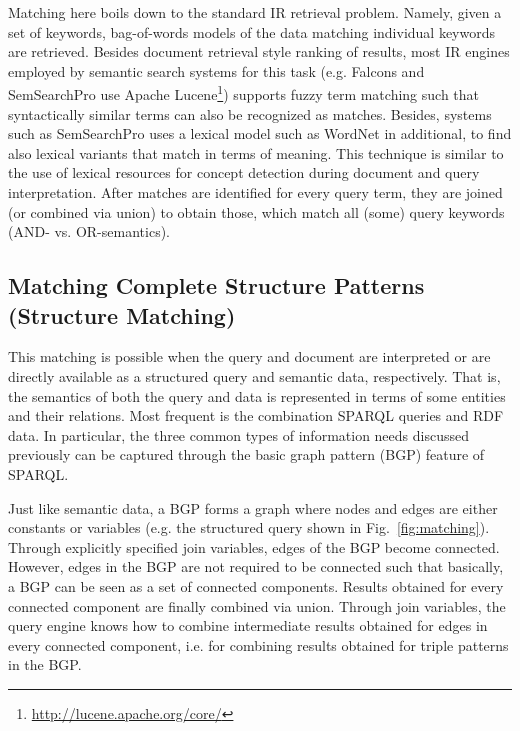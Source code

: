 Matching here boils down to the standard IR retrieval problem. Namely, given a set of keywords, bag-of-words models of the data matching individual keywords are retrieved. Besides document retrieval style ranking of results, most IR engines employed by semantic search systems for this task (e.g. Falcons and SemSearchPro use Apache Lucene\footnote{\url{http://lucene.apache.org/core/}}) supports fuzzy term matching such that syntactically similar terms can also be recognized as matches. Besides, systems such as SemSearchPro uses a lexical model such as WordNet in additional, to find also lexical variants that match in terms of meaning. This technique is similar to the use of lexical resources for concept detection during document and query interpretation. After matches are identified for every query term, they are joined (or combined via union) to obtain those, which match all (some) query keywords (AND- vs. OR-semantics). 

\subsection{Matching Complete Structure Patterns (Structure Matching)} 
	This matching is possible when the query and document are interpreted or are directly available as a structured query and semantic data, respectively. That is, the semantics of both the query and data is represented in terms of some entities and their relations. Most frequent is the combination SPARQL queries and RDF data. In particular, the three common types of information needs discussed previously can be captured through the basic graph pattern (BGP) feature of SPARQL. 
	
	Just like semantic data, a BGP forms a graph where nodes and edges are either constants or variables (e.g. the structured query shown in Fig.~\ref{fig:matching}). Through explicitly specified join variables, edges of the BGP become connected. However, edges in the BGP are not required to be connected such that basically, a BGP can be seen as a set of connected components. Results obtained for every connected component are finally combined via union. Through join variables, the query engine knows how to combine intermediate results obtained for edges in every connected component, i.e. for combining results obtained for triple patterns in the BGP. 
	

